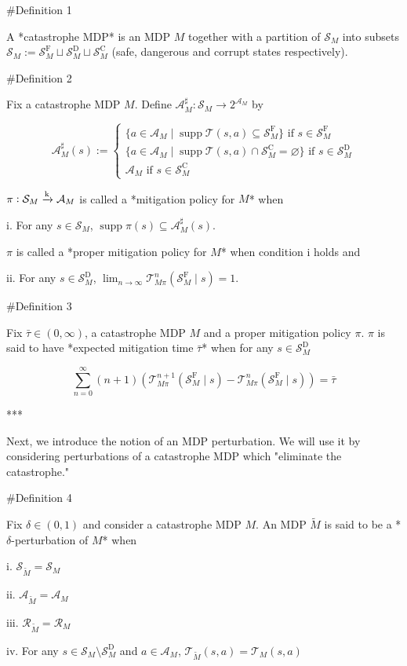 \documentclass[a4paper]{article}
\DeclareMathOperator{\Supp}{supp}
\newcommand{\AP}[1]{\left(#1\right)}
\newcommand{\M}{\xrightarrow{\textnormal{k}}}
\newcommand{\A}{\mathcal{A}}
\newcommand{\St}{\mathcal{S}}
\newcommand{\T}{\mathcal{T}}
\newcommand{\R}{\mathcal{R}}
\newcommand{\RMC}{\mathrm{C}}
\newcommand{\RMD}{\mathrm{D}}
\newcommand{\RMF}{\mathrm{F}}
\newcommand{\SF}{\St^{\RMF}}
\newcommand{\SD}{\St^{\RMD}}
\newcommand{\SC}{\St^{\RMC}}
\begin{document}
\#Definition 1

A *catastrophe MDP* is an MDP $M$ together with a partition of $\St_M$ into subsets $\St_M:=\SF_M \sqcup \SD_M \sqcup \SC_M$ (safe, dangerous and corrupt states respectively).

\#Definition 2

Fix a catastrophe MDP $M$. Define $\A_M^\sharp: \St_M \rightarrow 2^{\A_M}$ by

$$\A_M^\sharp(s):=\begin{cases} \{a \in \A_M \mid \Supp{\T(s,a)} \subseteq \SF_M\} \text{ if } s \in \SF_M \\ \{a \in \A_M \mid \Supp{\T(s,a)} \cap \SC_M = \varnothing\} \text{ if } s \in \SD_M \\ \A_M \text{ if } s \in \SC_M \end{cases}$$

$\pi: \St_M \M \A_M$ is called a *mitigation policy for $M$* when 

i. For any $s \in \St_M$, $\Supp{\pi(s)} \subseteq \A_M^\sharp(s)$. 

$\pi$ is called a *proper mitigation policy for $M$* when condition i holds and

ii. For any $s \in \SD_M$, $\lim_{n \rightarrow \infty} \T_{M\pi}^n\AP{\SF_M \mid s} = 1$. 

\#Definition 3

Fix $\bar{\tau} \in (0,\infty)$, a catastrophe MDP $M$ and a proper mitigation policy $\pi$. $\pi$ is said to have *expected mitigation time $\bar{\tau}$* when for any $s \in \SD_M$

$$\sum_{n=0}^\infty (n+1) \AP{\T_{M\pi}^{n+1}\AP{\SF_M \mid s}-\T_{M\pi}^{n}\AP{\SF_M \mid s}} = \bar{\tau}$$

***

Next, we introduce the notion of an MDP perturbation. We will use it by considering perturbations of a catastrophe MDP which "eliminate the catastrophe."

\#Definition 4

Fix $\delta\in(0,1)$ and consider a catastrophe MDP $M$. An MDP $\tilde{M}$ is said to be a *$\delta$-perturbation of $M$* when

i. $\St_{\tilde{M}} = \St_M$

ii. $\A_{\tilde{M}} = \A_M$

iii. $\R_{\tilde{M}}=\R_M$

iv. For any $s \in \St_M \setminus \SD_M$ and $a \in \A_M$, $\T_{\tilde{M}}\AP{s,a}=\T_{M}\AP{s,a}$
\end{document}
